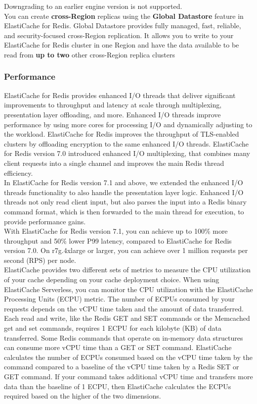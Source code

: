 \documentclass[12pt, letterpaper, twoside]{article}
\begin{document}
Downgrading to an earlier engine version is not supported.\\

You can create \textbf{cross-Region} replicas using the \textbf{Global Datastore} feature in ElastiCache for Redis. Global Datastore 
provides fully managed, fast, reliable, and security-focused cross-Region replication. It allows you to write to your 
ElastiCache for Redis cluster in one Region and have the data available to be read from \textbf{up to two} other cross-Region 
replica clusters

\subsubsection{Performance}
ElastiCache for Redis provides enhanced I/O threads that deliver significant improvements to throughput and latency 
at scale through multiplexing, presentation layer offloading, and more. Enhanced I/O threads improve performance by 
using more cores for processing I/O and dynamically adjusting to the workload. ElastiCache for Redis improves the 
throughput of TLS-enabled clusters by offloading encryption to the same enhanced I/O threads. ElastiCache for Redis 
version 7.0 introduced enhanced I/O multiplexing, that combines many client requests into a single channel and 
improves the main Redis thread efficiency.\\

In ElastiCache for Redis version 7.1 and above, we extended the enhanced I/O threads functionality to also handle 
the presentation layer logic. Enhanced I/O threads not only read client input, but also parses the input into a 
Redis binary command format, which is then forwarded to the main thread for execution, to provide performance gains.\\
With ElastiCache for Redis version 7.1, you can achieve up to 100\% more throughput and 50\% lower P99 latency, 
compared to ElastiCache for Redis version 7.0. On r7g.4xlarge or larger, you can achieve over 1 million requests 
per second (RPS) per node.\\

ElastiCache provides two different sets of metrics to measure the CPU utilization of your cache depending on 
your cache deployment choice. When using ElastiCache Serverless, you can monitor the CPU utilization with the 
ElastiCache Processing Units (ECPU) metric. The number of ECPUs consumed by your requests depends on the vCPU 
time taken and the amount of data transferred. Each read and write, like the Redis GET and SET commands or the 
Memcached get and set commands, requires 1 ECPU for each kilobyte (KB) of data transferred. Some Redis 
commands that operate on in-memory data structures can consume more vCPU time than a GET or SET command. ElastiCache 
calculates the number of ECPUs consumed based on the vCPU time taken by the command compared to a baseline of 
the vCPU time taken by a Redis SET or GET command. If your command takes additional vCPU time and transfers more 
data than the baseline of 1 ECPU, then ElastiCache calculates the ECPUs required based on the higher of the 
two dimensions.\\
\end{document}
